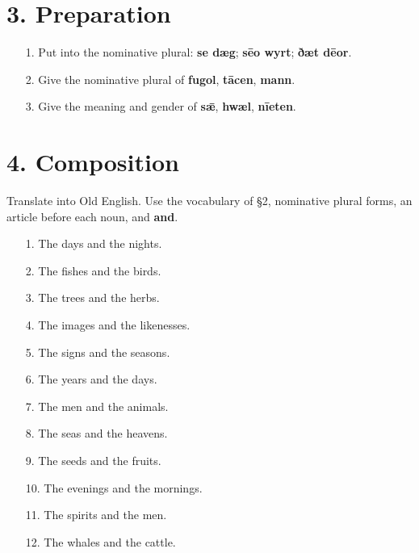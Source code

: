\section*{3. Preparation}


\begin{enumerate}
\item[1.] Put into the nominative plural: \textbf{se dæg}; \textbf{sēo wyrt}; \textbf{ðæt dēor}.
\item[2.] Give the nominative plural of \textbf{fugol}, \textbf{tācen}, \textbf{mann}.
\item[3.] Give the meaning and gender of \textbf{sǣ}, \textbf{hwæl}, \textbf{nīeten}.
\end{enumerate}


\clearpage
{}
\section*{4. Composition}


Translate into Old English. Use the vocabulary of §2, nominative plural forms, an article before each noun, and \textbf{and}.


\begin{enumerate}
\item[1.] The days and the nights.
\item[2.] The fishes and the birds.
\item[3.] The trees and the herbs.
\item[4.] The images and the likenesses.
\item[5.] The signs and the seasons.
\item[6.] The years and the days.
\item[7.] The men and the animals.
\item[8.] The seas and the heavens.
\item[9.] The seeds and the fruits.
\item[10.] The evenings and the mornings.
\item[11.] The spirits and the men.
\item[12.] The whales and the cattle.
\end{enumerate}


